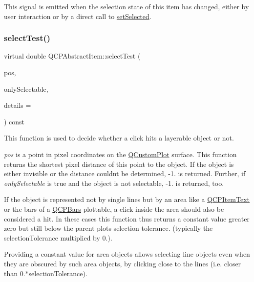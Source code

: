 This signal is emitted when the selection state of this item has changed, either by user interaction or by a direct call to \mbox{\hyperlink{class_q_c_p_abstract_item_a203de94ad586cc44d16c9565f49d3378}{set\+Selected}}. \mbox{\label{class_q_c_p_abstract_item_ae41d0349d68bb802c49104afd100ba2a}} 
\subsubsection{\texorpdfstring{selectTest()}{selectTest()}}
{\footnotesize\ttfamily virtual double Q\+C\+P\+Abstract\+Item\+::select\+Test (\begin{DoxyParamCaption}\item[{const Q\+PointF \&}]{pos,  }\item[{bool}]{only\+Selectable,  }\item[{Q\+Variant $\ast$}]{details = {} }\end{DoxyParamCaption}) const\hspace{0.3cm}{\ttfamily [pure virtual]}}

This function is used to decide whether a click hits a layerable object or not.

{\itshape pos} is a point in pixel coordinates on the \mbox{\hyperlink{class_q_custom_plot}{Q\+Custom\+Plot}} surface. This function returns the shortest pixel distance of this point to the object. If the object is either invisible or the distance couldn\textquotesingle{}t be determined, -\/1. is returned. Further, if {\itshape only\+Selectable} is true and the object is not selectable, -\/1. is returned, too.

If the object is represented not by single lines but by an area like a \mbox{\hyperlink{class_q_c_p_item_text}{Q\+C\+P\+Item\+Text}} or the bars of a \mbox{\hyperlink{class_q_c_p_bars}{Q\+C\+P\+Bars}} plottable, a click inside the area should also be considered a hit. In these cases this function thus returns a constant value greater zero but still below the parent plot\textquotesingle{}s selection tolerance. (typically the selection\+Tolerance multiplied by 0.).

Providing a constant value for area objects allows selecting line objects even when they are obscured by such area objects, by clicking close to the lines (i.\+e. closer than 0.$\ast$selection\+Tolerance).

